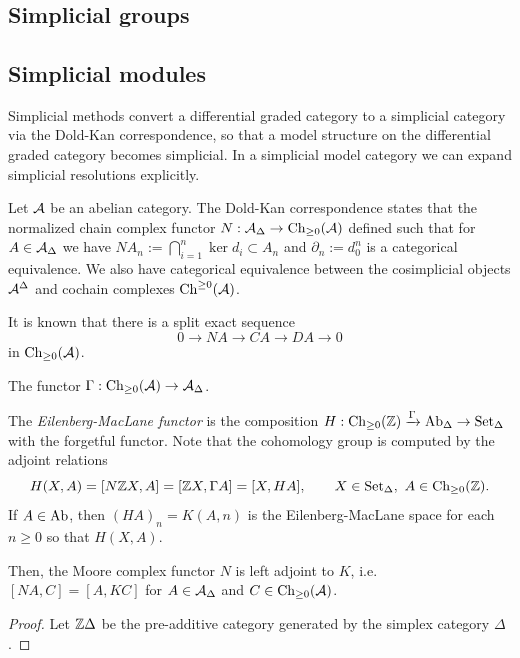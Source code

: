 \documentclass{../../large}
\begin{document}
\chapter{}




\section{Simplicial groups}


\section{Simplicial modules}

Simplicial methods convert a differential graded category to a simplicial category via the Dold-Kan correspondence, so that a model structure on the differential graded category becomes simplicial.
In a simplicial model category we can expand simplicial resolutions explicitly.

\begin{prb}
Let $\mathcal{A}$ be an abelian category.
The Dold-Kan correspondence states that the normalized chain complex functor $N:\mathcal{A}_\Delta\to\operatorname{Ch}_{\ge0}(\mathcal{A})$ defined such that for $A\in\mathcal{A}_\Delta$ we have $NA_n:=\bigcap_{i=1}^n\ker d_i\subset A_n$ and $\partial_n:=d_0^n$ is a categorical equivalence.
We also have categorical equivalence between the cosimplicial objects $\mathcal{A}^\Delta$ and cochain complexes $\operatorname{Ch}^{\ge0}(\mathcal{A})$.

It is known that there is a split exact sequence
\[0\to NA\to CA\to DA\to0\]
in $\operatorname{Ch}_{\ge0}(\mathcal{A})$.


The functor $\Gamma:\operatorname{Ch}_{\ge0}(\mathcal{A})\to\mathcal{A}_\Delta$.

The \emph{Eilenberg-MacLane functor} is the composition $H:\operatorname{Ch}_{\ge0}(\mathbb{Z})\xrightarrow{\Gamma}\operatorname{Ab}_\Delta\to\operatorname{Set}_\Delta$ with the forgetful functor.
Note that the cohomology group is computed by the adjoint relations
\[H(X,A)=[N\Z X,A]=[\Z X,\Gamma A]=[X,HA],\qquad X\in\Set_\Delta,\ A\in\Ch_{\ge0}(\Z).\]
If $A\in\operatorname{Ab}$, then $(HA)_n=K(A,n)$ is the Eilenberg-MacLane space for each $n\ge0$ so that $H(X,A)$.

Then, the Moore complex functor $N$ is left adjoint to $K$, i.e.~$[NA,C]=[A,KC]$ for $A\in\mathcal{A}_\Delta$ and $C\in\operatorname{Ch}_{\ge0}(\mathcal{A})$.
\end{prb}
\begin{proof}
Let $\mathbb{Z}\Delta$ be the pre-additive category generated by the simplex category $\Delta$.
\end{proof}
\end{document}
